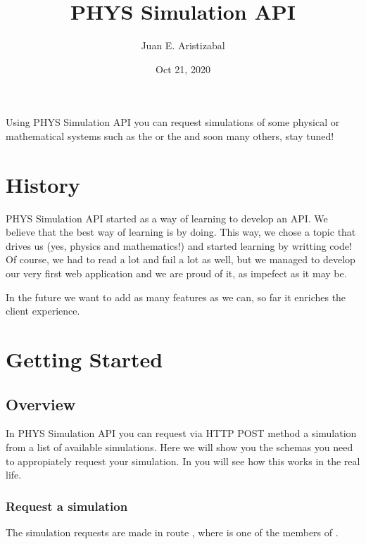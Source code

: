 \documentclass[a4paper,landscape,10pt,english]{sphinxmanual}
\title{PHYS Simulation API}
\date{Oct 21, 2020}
\author{Juan E.\@{} Aristizabal}
\begin{document}
\pagestyle{empty}
\sphinxmaketitle
\pagestyle{plain}
\sphinxtableofcontents
\pagestyle{normal}
\label{\detokenize{index::doc}}


Using PHYS Simulation API you can request simulations of some physical or
mathematical systems such as the  or the
 \textendash{}and soon many others, stay tuned!


\chapter{History}
\label{\detokenize{index:history}}
PHYS Simulation API started as a way of learning to develop an API.
We believe that the best way of learning is by doing. This way, we chose
a topic that drives us (yes, physics and mathematics!) and started learning by
writting code! Of course, we had to read a lot and fail a lot as well, but
we managed to develop our very first web application and we are proud of it, as
impefect as it may be.

In the future we want to add as many features as we can, so far it enriches
the client experience.


\chapter{Getting Started}
\label{\detokenize{index:getting-started}}

\section{Overview}
\label{\detokenize{start/overview:overview}}\label{\detokenize{start/overview:start-overview}}\label{\detokenize{start/overview::doc}}
In PHYS Simulation API you can request \textendash{}via HTTP POST method\textendash{} a simulation from
a list of available simulations. Here we will show you the schemas you need to
appropiately request your simulation. In {\hyperref[\detokenize{start/examples:start-examples}]{}} you
will see how this works in the real life.


\subsection{Request a simulation}
\label{\detokenize{start/overview:request-a-simulation}}
The simulation requests are made in route ,
where  is one of the members of
.
\end{document}
